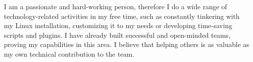 \documentclass[11pt, a4paper]{awesome-cv}
\begin{document}
\makecvheader

\newline
I am a passionate and hard-working person, therefore I do a wide range of technology-related activities in my free time, such as constantly tinkering with my Linux installation, customizing it to my needs or developing time-saving scripts and plugins.
I have already built successful and open-minded teams, proving my capabilities in this area. I believe that helping others is as valuable as my own technical contribution to the team.







\end{document}

